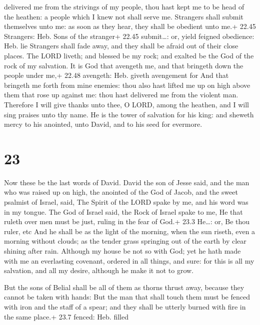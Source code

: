 delivered me from the strivings of my people, thou hast kept me to be
head of the heathen: a people which I knew not shall serve me.
 Strangers shall submit themselves unto me: as soon as they
hear, they shall be obedient unto me.+ 22.45 Strangers: Heb. Sons of the
stranger+ 22.45 submit\ldots: or, yield feigned obedience: Heb. lie
 Strangers shall fade away, and they shall be afraid out of
their close places.  The LORD liveth; and blessed be my
rock; and exalted be the God of the rock of my salvation. 
It is God that avengeth me, and that bringeth down the people under me,+
22.48 avengeth: Heb. giveth avengement for  And that
bringeth me forth from mine enemies: thou also hast lifted me up on high
above them that rose up against me: thou hast delivered me from the
violent man.  Therefore I will give thanks unto thee, O
LORD, among the heathen, and I will sing praises unto thy name.
 He is the tower of salvation for his king: and sheweth
mercy to his anointed, unto David, and to his seed for evermore.

\hypertarget{section-22}{%
\section{23}\label{section-22}}

 Now these be the last words of David. David the son of
Jesse said, and the man who was raised up on high, the anointed of the
God of Jacob, and the sweet psalmist of Israel, said,  The
Spirit of the LORD spake by me, and his word was in my tongue.
 The God of Israel said, the Rock of Israel spake to me, He
that ruleth over men must be just, ruling in the fear of God.+ 23.3
He\ldots: or, Be thou ruler, etc  And he shall be as the
light of the morning, when the sun riseth, even a morning without
clouds; as the tender grass springing out of the earth by clear shining
after rain.  Although my house be not so with God; yet he
hath made with me an everlasting covenant, ordered in all things, and
sure: for this is all my salvation, and all my desire, although he make
it not to grow.

 But the sons of Belial shall be all of them as thorns
thrust away, because they cannot be taken with hands:  But
the man that shall touch them must be fenced with iron and the staff of
a spear; and they shall be utterly burned with fire in the same place.+
23.7 fenced: Heb. filled

